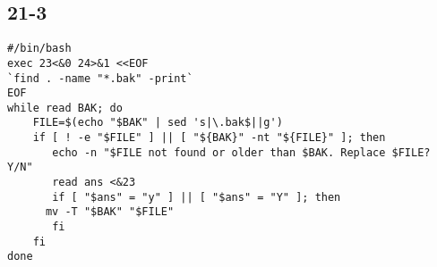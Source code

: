 \subsection{21-3}
\begin{verbatim}
#/bin/bash
exec 23<&0 24>&1 <<EOF
`find . -name "*.bak" -print`
EOF
while read BAK; do
    FILE=$(echo "$BAK" | sed 's|\.bak$||g')
    if [ ! -e "$FILE" ] || [ "${BAK}" -nt "${FILE}" ]; then
       echo -n "$FILE not found or older than $BAK. Replace $FILE? Y/N"
       read ans <&23
       if [ "$ans" = "y" ] || [ "$ans" = "Y" ]; then
	  mv -T "$BAK" "$FILE"
       fi
    fi
done
\end{verbatim}

